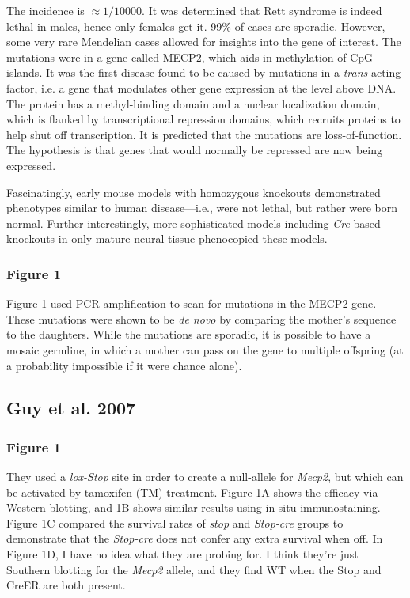 \documentclass[12pt]{report}
\begin{document}
The incidence is $\approx 1/10000$. It was determined that Rett syndrome is indeed lethal in males, hence only females get it. 99\% of cases are sporadic. However, some very rare Mendelian cases allowed for insights into the gene of interest. The mutations were in a gene called MECP2, which aids in methylation of CpG islands. It was the first disease found to be caused by mutations in a \textit{trans}-acting factor, i.e. a gene that modulates other gene expression at the level above DNA. The protein has a methyl-binding domain and a nuclear localization domain, which is flanked by transcriptional repression domains, which recruits proteins to help shut off transcription. It is predicted that the mutations are loss-of-function. The hypothesis is that genes that would normally be repressed are now being expressed.\newline

Fascinatingly, early mouse models with homozygous knockouts demonstrated phenotypes similar to human disease---i.e., were not lethal, but rather were born normal. Further interestingly, more sophisticated models including \textit{Cre}-based knockouts in only mature neural tissue phenocopied these models. 

\subsubsection{Figure 1}

Figure 1 used PCR amplification to scan for mutations in the MECP2 gene. These mutations were shown to be \textit{de novo} by comparing the mother's sequence to the daughters. While the mutations are sporadic, it is possible to have a mosaic germline, in which a mother can pass on the gene to multiple offspring (at a probability impossible if it were chance alone). 



\subsection{Guy et al. 2007}

\subsubsection{Figure 1}

They used a \textit{lox-Stop} site in order to create a null-allele for \textit{Mecp2}, but which can be activated by tamoxifen (TM) treatment. Figure 1A shows the efficacy via Western blotting, and 1B shows similar results using in situ immunostaining. Figure 1C compared the survival rates of \textit{stop} and \textit{Stop-cre} groups to demonstrate that the \textit{Stop-cre} does not confer any extra survival when off. In Figure 1D, I have no idea what they are probing for. I think they're just Southern blotting for the \textit{Mecp2} allele, and they find WT when the Stop and CreER are both present. 
\end{document}
